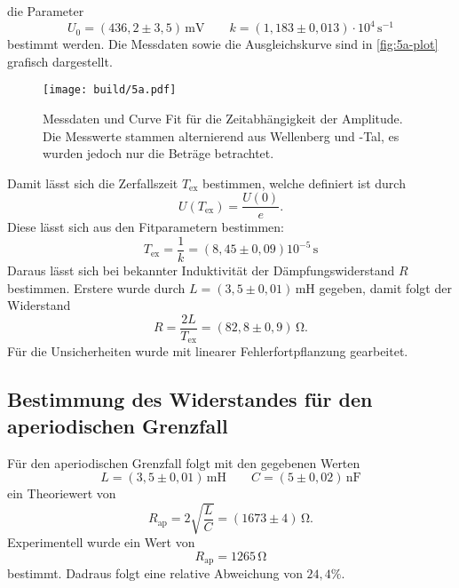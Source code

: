 die Parameter
\begin{equation}
	U_0 = (436,2 \pm 3,5) \, \si{\milli\volt}
	\qquad
	k = (1,183 \pm 0,013) \cdot 10^4 \, \si{\second^{-1}}
\end{equation}
bestimmt werden. Die Messdaten sowie die Ausgleichskurve sind in \autoref{fig:5a-plot}
grafisch dargestellt.
\begin{figure}[H]
	\centering
	\texttt{[image: build/5a.pdf]}
	\caption{Messdaten und Curve Fit für die Zeitabhängigkeit der Amplitude. Die
		Messwerte stammen alternierend aus Wellenberg und -Tal, es wurden jedoch
	nur die Beträge betrachtet.}
	\label{fig:5a-plot}
\end{figure}
\noindent
Damit lässt sich die Zerfallszeit $T_\text{ex}$ bestimmen, welche definiert ist durch
\begin{equation}
	U\left( T_\text{ex} \right) = \frac{U(0)}{e}.
\end{equation}
Diese lässt sich aus den Fitparametern bestimmen:
\begin{equation}
	T_\text{ex} = \frac{1}{k} = (8,45 \pm 0,09)10^{-5} \, \si{\second}
\end{equation}
Daraus lässt sich bei bekannter Induktivität der Dämpfungswiderstand $R$ bestimmen.
Erstere wurde durch $L = (3,5 \pm 0,01) \, \si{\milli\henry}$ gegeben, damit folgt der
Widerstand
\begin{equation}
	R = \frac{2L}{T_\text{ex}} = (82,8 \pm 0,9) \, \si{\ohm}.
\end{equation}
Für die Unsicherheiten wurde mit linearer Fehlerfortpflanzung gearbeitet.

\subsection{Bestimmung des Widerstandes für den aperiodischen Grenzfall}
\label{sec:Bestimmung des Widerstandes für den Aperiodischen Grenzfall}
Für den aperiodischen Grenzfall folgt mit den gegebenen Werten
\begin{equation}
	L = (3,5 \pm 0,01) \, \si{\milli\henry}
	\qquad
	C = (5 \pm 0,02) \, \si{\nano\farad}
\end{equation}
ein Theoriewert von
\begin{equation}
	R_\text{ap} = 2 \sqrt{\frac{L}{C}} = (1673 \pm 4) \, \si{\ohm}.
\end{equation}
Experimentell wurde ein Wert von
\begin{equation}
	R_\text{ap} = 1265 \, \si{\ohm}
\end{equation}
bestimmt. Dadraus folgt eine relative Abweichung von $24,4 \%$.

